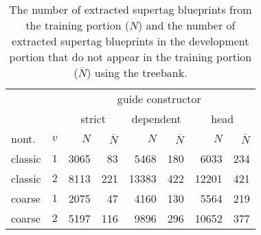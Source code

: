 \documentclass[../../document.tex]{subfiles}
\begin{document}
    \subsection{}
    \begin{table}
        \caption{\label{tbl:experiments:tiger:size}
        The number of extracted supertag blueprints from the training portion ($N$) and the number of extracted supertag blueprints in the development portion that do not appear in the training portion ($\overline{N}$) using the \tiger{} treebank.
        }
        \centering
        \setlength{\tabcolsep}{4pt}
        \vspace{.2cm}
        \begin{tabular}{lc|rr|rr|rr}
            \toprule
                && \multicolumn{6}{c}{guide constructor}\\
            &        & \multicolumn{2}{c|}{strict} & \multicolumn{2}{c|}{dependent} & \multicolumn{2}{c}{head}  \\
   nont.   &\(v\)   & $N$ & $\overline{N}$ & $N$ & $\overline{N}$ & $N$ & $\overline{N}$ \\ \hline
   classic & \(1\)  & 3065 &  83 &  5468 & 180 &  6033 & 234  \\
   classic & \(2\)  & 8113 & 221 & 13383 & 422 & 12201 & 421   \\
   coarse  & \(1\)  & 2075 &  47 &  4160 & 130 &  5564 & 219      \\
   coarse  & \(2\)  & 5197 & 116 &  9896 & 296 & 10652 & 377  \\
    \bottomrule
        \end{tabular}
    \end{table}
\end{document}
